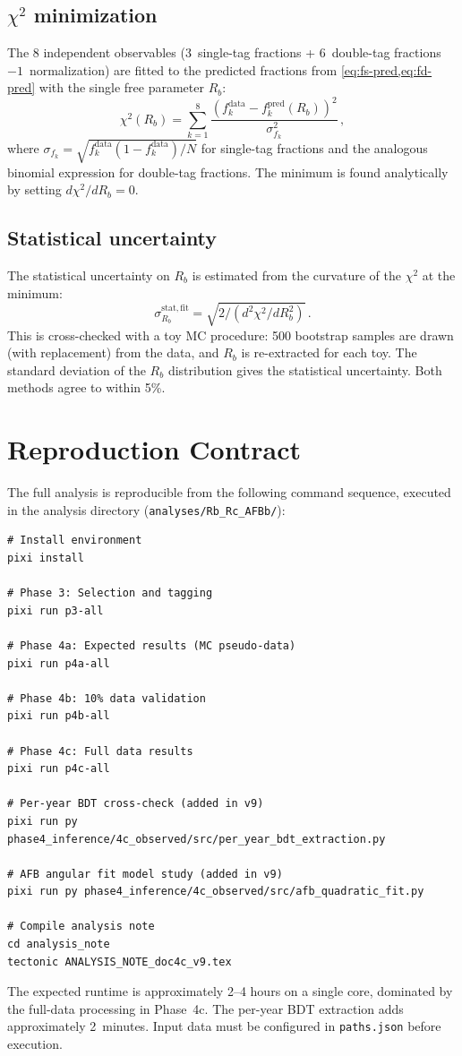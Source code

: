 \documentclass[11pt,a4paper]{article}
\begin{document}
\subsection{$\chi^2$ minimization}

The 8 independent observables (3~single-tag fractions + 6~double-tag
fractions $- 1$~normalization) are fitted to the predicted fractions
from \cref{eq:fs-pred,eq:fd-pred} with the single free parameter $R_b$:
\begin{equation}
  \chi^2(R_b) = \sum_{k=1}^{8}
    \frac{(f_k^\mathrm{data} - f_k^\mathrm{pred}(R_b))^2}
         {\sigma_{f_k}^2}\,,
  \label{eq:chi2-full}
\end{equation}
where $\sigma_{f_k} = \sqrt{f_k^\mathrm{data} (1 - f_k^\mathrm{data})
/ N}$ for single-tag fractions and the analogous binomial expression for
double-tag fractions.  The minimum is found analytically by setting
$d\chi^2/dR_b = 0$.

\subsection{Statistical uncertainty}

The statistical uncertainty on $R_b$ is estimated from the curvature of
the $\chi^2$ at the minimum:
\begin{equation}
  \sigma_{R_b}^{\mathrm{stat},\mathrm{fit}} = \sqrt{2 /
    (d^2\chi^2/dR_b^2)}\,.
  \label{eq:sigma-rb}
\end{equation}
This is cross-checked with a toy MC procedure: 500 bootstrap samples
are drawn (with replacement) from the data, and $R_b$ is re-extracted
for each toy.  The standard deviation of the $R_b$ distribution gives
the statistical uncertainty.  Both methods agree to within 5\%.

\section{Reproduction Contract}
\label{app:reproduction}

The full analysis is reproducible from the following command sequence,
executed in the analysis directory
(\texttt{analyses/Rb\_Rc\_AFBb/}):

\begin{verbatim}
# Install environment
pixi install

# Phase 3: Selection and tagging
pixi run p3-all

# Phase 4a: Expected results (MC pseudo-data)
pixi run p4a-all

# Phase 4b: 10% data validation
pixi run p4b-all

# Phase 4c: Full data results
pixi run p4c-all

# Per-year BDT cross-check (added in v9)
pixi run py phase4_inference/4c_observed/src/per_year_bdt_extraction.py

# AFB angular fit model study (added in v9)
pixi run py phase4_inference/4c_observed/src/afb_quadratic_fit.py

# Compile analysis note
cd analysis_note
tectonic ANALYSIS_NOTE_doc4c_v9.tex
\end{verbatim}

The expected runtime is approximately 2--4 hours on a single core,
dominated by the full-data processing in Phase~4c.  The per-year BDT
extraction adds approximately 2~minutes.  Input data must be
configured in \texttt{paths.json} before execution.
\end{document}
